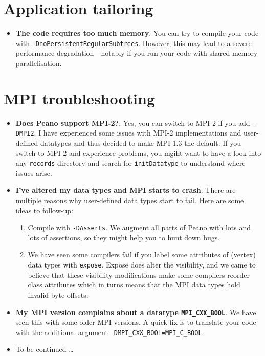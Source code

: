 \section{Application tailoring}

\begin{itemize}
  \item {\bf The code requires too much memory}.
  You can try to compile your code with
  \linebreak \texttt{-DnoPersistentRegularSubtrees}.
  However, this may lead to a severe performance \linebreak
  degradation---notably if you run your code with shared memory parallelisation.
\end{itemize}

\section{MPI troubleshooting}

\begin{itemize}
  \item {\bf Does Peano support MPI-2?}. Yes, you can switch to MPI-2 if you add
  \texttt{-DMPI2}. I have experienced some issues with MPI-2 implementations and
  user-defined datatypes and thus decided to make MPI 1.3 the default. If you
  switch to MPI-2 and experience problems, you  mgiht want to have a look into
  any \texttt{records} directory and search for \texttt{initDatatype} to
  understand where issues arise.
  \item {\bf I've altered my data types and MPI starts to crash}. There are
  multiple reasons why user-defined data types start to fail. Here are some
  ideas to follow-up:
    \begin{enumerate}
      \item Compile with \texttt{-DAsserts}. We augment all parts of Peano with
      lots and lots of assertions, so they might help you to hunt down bugs.
      \item We have seen some compilers fail if you label some attributes of
      (vertex) data types with \texttt{expose}. Expose does alter the
      visibility, and we came to believe that these visibility modifications
      make some compilers reorder class attributes which in turns means that the
      MPI data types hold invalid byte offsets.
    \end{enumerate}
  \item {\bf My MPI version complains about a datatype \texttt{MPI\_CXX\_BOOL}}. 
    We have seen this with some older MPI versions. A quick fix is to translate
    your code with the additional argument
    \texttt{-DMPI\_CXX\_BOOL=MPI\_C\_BOOL}.
  \item To be continued \ldots
\end{itemize}


